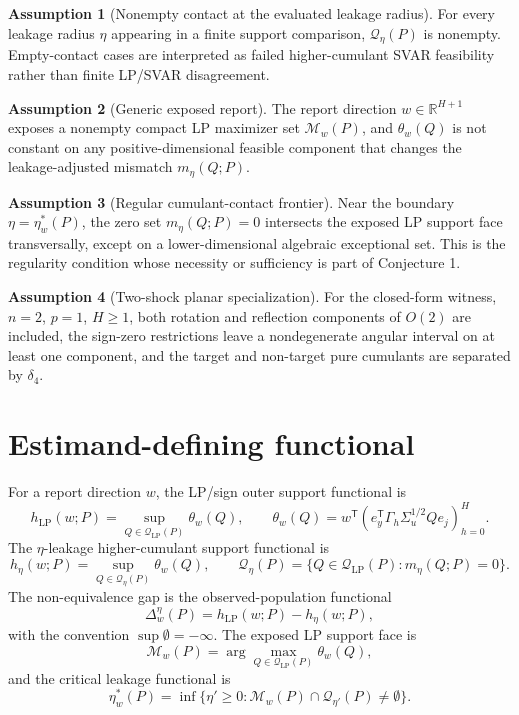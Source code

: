 \documentclass[11pt]{article}
\newcommand{\transpose}{\mathsf{T}}
\newcommand{\R}{\mathbb{R}}
\theoremstyle{definition}
\newtheorem{assumption}{Assumption}
\theoremstyle{plain}
\theoremstyle{remark}
\begin{document}
\begin{assumption}[Nonempty contact at the evaluated leakage radius]\label{ass:contact-nonempty}
For every leakage radius \(\eta\) appearing in a finite support comparison, \(\mathcal Q_\eta(P)\) is nonempty.  Empty-contact cases are interpreted as failed higher-cumulant SVAR feasibility rather than finite LP/SVAR disagreement.
\end{assumption}

\begin{assumption}[Generic exposed report]\label{ass:generic-exposed}
The report direction \(w\in\R^{H+1}\) exposes a nonempty compact LP maximizer set \(\mathcal M_w(P)\), and \(\theta_w(Q)\) is not constant on any positive-dimensional feasible component that changes the leakage-adjusted mismatch \(m_\eta(Q;P)\).
\end{assumption}

\begin{assumption}[Regular cumulant-contact frontier]\label{ass:regular-frontier}
Near the boundary \(\eta=\eta_w^*(P)\), the zero set \(m_\eta(Q;P)=0\) intersects the exposed LP support face transversally, except on a lower-dimensional algebraic exceptional set.  This is the regularity condition whose necessity or sufficiency is part of Conjecture 1.
\end{assumption}

\begin{assumption}[Two-shock planar specialization]\label{ass:two-shock}
For the closed-form witness, \(n=2\), \(p=1\), \(H\ge1\), both rotation and reflection components of \(O(2)\) are included, the sign-zero restrictions leave a nondegenerate angular interval on at least one component, and the target and non-target pure cumulants are separated by \(\delta_4\).
\end{assumption}

\section{Estimand-defining functional}
For a report direction \(w\), the LP/sign outer support functional is
\[
h_{\mathrm{LP}}(w;P)=
\sup_{Q\in\mathcal Q_{\mathrm{LP}}(P)}\theta_w(Q),
\qquad
\theta_w(Q)=w^\transpose\left(e_y^\transpose\Gamma_h\Sigma_u^{1/2}Qe_j\right)_{h=0}^H .
\]
The \(\eta\)-leakage higher-cumulant support functional is
\[
h_\eta(w;P)=\sup_{Q\in\mathcal Q_\eta(P)}\theta_w(Q),
\qquad
\mathcal Q_\eta(P)=
\{Q\in\mathcal Q_{\mathrm{LP}}(P):m_\eta(Q;P)=0\}.
\]
The non-equivalence gap is the observed-population functional
\[
\Delta_w^\eta(P)=h_{\mathrm{LP}}(w;P)-h_\eta(w;P),
\]
with the convention \(\sup\emptyset=-\infty\).  The exposed LP support face is
\[
\mathcal M_w(P)=\arg\max_{Q\in\mathcal Q_{\mathrm{LP}}(P)}\theta_w(Q),
\]
and the critical leakage functional is
\[
\eta_w^*(P)=
\inf\{\eta'\ge0:\mathcal M_w(P)\cap\mathcal Q_{\eta'}(P)\ne\emptyset\}.
\]
\end{document}
